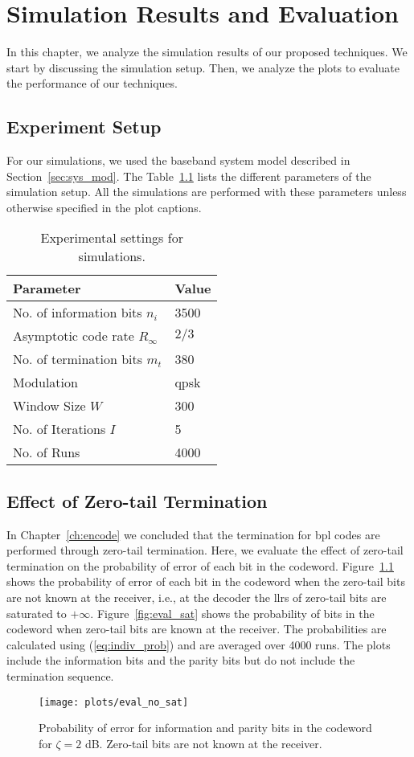 \chapter{Simulation Results and Evaluation}\label{ch:simulation}
In this chapter, we analyze the simulation results of our proposed techniques. We start by discussing the simulation setup. Then, we analyze the plots to evaluate the performance of our techniques.

\section{Experiment Setup}
For our simulations, we used the baseband system model described in Section~\ref{sec:sys_mod}. The Table~\ref{tab:sim_param} lists the different parameters of the simulation setup. All the simulations are performed with these parameters unless otherwise specified in the plot captions.
\begin{table}[htbp]
\centering
\begin{tabular}{|l|l|}
  \hline
  \textbf{Parameter} &\textbf{Value}\\
  \hline
  \hline
  No. of information bits $n_i$ &3500\\
  \hline
  Asymptotic code rate $R_\infty$ &$2/3$\\
  \hline
  No. of termination bits $m_t$ &380\\
  \hline
  Modulation &\gls{qpsk}\\
  \hline
  Window Size $W$ &300\\
  \hline
  No. of Iterations $I$ &5\\
  \hline
  No. of Runs &4000\\
  \hline
\end{tabular}
\caption{Experimental settings for simulations.}
\label{tab:sim_param}
\end{table}

\section{Effect of Zero-tail Termination}
In Chapter~\ref{ch:encode} we concluded that the termination for \gls{bpl} codes are performed through zero-tail termination. Here, we evaluate the effect of zero-tail termination on the probability of error of each bit in the codeword. Figure~\ref{fig:eval_no_sat} shows the probability of error of each bit in the codeword when the zero-tail bits are not known at the receiver, i.e., at the decoder the \glspl{llr} of zero-tail bits are saturated to $+\infty$. Figure~\ref{fig:eval_sat} shows the probability of bits in the codeword when zero-tail bits are known at the receiver. The probabilities are calculated using (\ref{eq:indiv_prob}) and are averaged over 4000 runs.  The plots include the information bits and the parity bits but do not include the termination sequence.
\begin{figure}[htbp]
  \centering
  \texttt{[image: plots/eval\_no\_sat]}
  \caption{Probability of error for information and parity bits in the codeword for $\zeta=2$ dB. Zero-tail bits are not known at the receiver.}
  \label{fig:eval_no_sat}
\end{figure}

